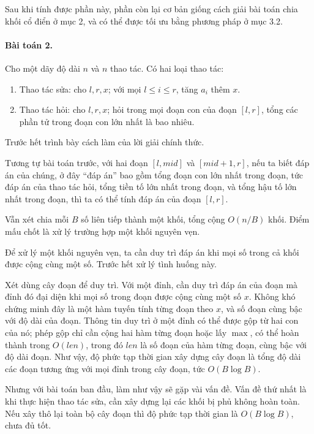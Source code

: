 \documentclass[11pt]{article}
\begin{document}
Sau khi tính được phần này, phần còn lại cơ bản giống cách giải bài toán chia
khối cổ điển ở mục 2, và có thể được tối ưu bằng phương pháp ở mục 3.2.

\paragraph{Bài toán 2.}
Cho một dãy độ dài $n$ và $n$ thao tác. Có hai loại thao tác:

\begin{enumerate}
  \item Thao tác sửa: cho $l,r,x$; với mọi $l\le i\le r$, tăng $a_i$ thêm $x$.
  \item Thao tác hỏi: cho $l,r,x$; hỏi trong mọi đoạn con của đoạn $[l,r]$, tổng
  các phần tử trong đoạn con lớn nhất là bao nhiêu.
\end{enumerate}

Trước hết trình bày cách làm của lời giải chính thức.

Tương tự bài toán trước, với hai đoạn $[l,\mathit{mid}]$ và
$[\mathit{mid}+1,r]$, nếu ta biết đáp án của chúng, ở đây ``đáp án'' bao gồm
tổng đoạn con lớn nhất trong đoạn, tức đáp án của thao tác hỏi, tổng tiền tố
lớn nhất trong đoạn, và tổng hậu tố lớn nhất trong đoạn, thì ta có thể tính
đáp án của đoạn $[l,r]$.

Vẫn xét chia mỗi $B$ số liên tiếp thành một khối, tổng cộng $O(n/B)$ khối. Điểm
mấu chốt là xử lý trường hợp một khối nguyên vẹn.

Để xử lý một khối nguyên vẹn, ta cần duy trì đáp án khi mọi số trong cả khối
được cộng cùng một số. Trước hết xử lý tình huống này.

Xét dùng cây đoạn để duy trì. Với một đỉnh, cần duy trì đáp án của đoạn mà đỉnh
đó đại diện khi mọi số trong đoạn được cộng cùng một số $x$. Không khó chứng
minh đây là một hàm tuyến tính từng đoạn theo $x$, và số đoạn cùng bậc với độ
dài của đoạn. Thông tin duy trì ở một đỉnh có thể được gộp từ hai con của nó;
phép gộp chỉ cần cộng hai hàm từng đoạn hoặc lấy $\max$, có thể hoàn thành
trong $O(\mathit{len})$, trong đó $\mathit{len}$ là số đoạn của hàm từng đoạn,
cùng bậc với độ dài đoạn. Như vậy, độ phức tạp thời gian xây dựng cây đoạn là
tổng độ dài các đoạn tương ứng với mọi đỉnh trong cây đoạn, tức $O(B\log B)$.

Nhưng với bài toán ban đầu, làm như vậy sẽ gặp vài vấn đề. Vấn đề thứ nhất là
khi thực hiện thao tác sửa, cần xây dựng lại các khối bị phủ không hoàn toàn.
Nếu xây thô lại toàn bộ cây đoạn thì độ phức tạp thời gian là $O(B\log B)$,
chưa đủ tốt.
\end{document}
